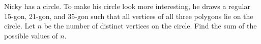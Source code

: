 Nicky has a circle. To make his circle look more interesting, he draws a regular 15-gon, 21-gon, and 35-gon such that all vertices of all three polygons lie on the circle. Let $n$ be the number of distinct vertices on the circle. Find the sum of the possible values of $n$.
